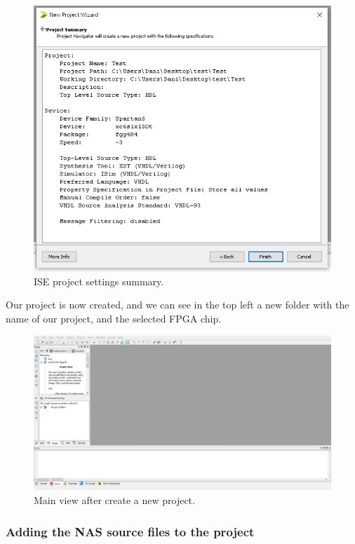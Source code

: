 \begin{figure}[H]
\centering
\includegraphics[width=1\textwidth]{images/Img32_NewProject_Summary.PNG}
\caption{\label{fig:ISE_project_summary}ISE project settings summary.}
\end{figure}

Our project is now created, and we can see in the top left a new folder with the name of our project, and the selected FPGA chip.

\begin{figure}[H]
\centering
\includegraphics[width=1\textwidth]{images/Img33_NewProject.PNG}
\caption{\label{fig:ISE_project_created}Main view after create a new project.}
\end{figure}

\subsubsection{Adding the NAS source files to the project}

